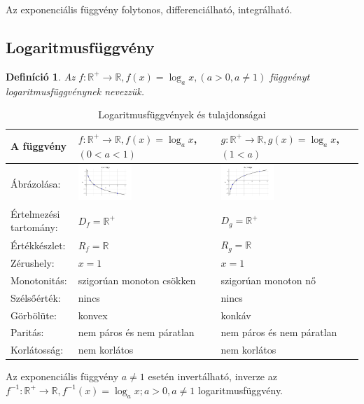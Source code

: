 \documentclass[12pt,a4paper]{article}
\newtheorem{definition}{Definíció} [section]
\begin{document}
Az exponenciális függvény folytonos, differenciálható, integrálható.

\newpage
\subsection{Logaritmusfüggvény}
\begin{definition}
Az $f:\mathbb{R}^+\rightarrow\mathbb{R}, f(x)=\log_ax, (a>0, a\neq 1)$  függvényt logaritmusfüggvénynek nevezzük.
\end{definition}

\begin{table}[h!]
\centering
\begin{tabular}{ | m{3cm} || m{6cm} | m{6cm} | }
A függvény & $f:\mathbb{R}^+\rightarrow\mathbb{R}, f(x)=\log_ax$,\newline $(0<a<1)$ & $g:\mathbb{R}^+\rightarrow\mathbb{R}, g(x)=\log_ax$,\newline $(1<a)$ \\
\hline
Ábrázolása: &\centering \includegraphics[width=0.4\textwidth]{chart/2021-10-31--12:59:11} & \includegraphics[width=0.4\textwidth]{chart/2021-10-31--13:00:36}\\
\hline
Értelmezési tartomány: & $D_f=\mathbb{R}^+$ & $D_g=\mathbb{R}^+$ \\
\hline
Értékkészlet: & $R_f=\mathbb{R}$ & $R_g=\mathbb{R}$\\
\hline
Zérushely: & $x = 1$& $x = 1$\\
\hline
Monotonitás: &szigorúan monoton csökken&szigorúan monoton nő \\
\hline
Szélsőérték: & nincs & nincs\\
\hline
Görbölüte: & konvex & konkáv\\
\hline
Paritás: & nem páros és nem páratlan & nem páros és nem páratlan \\
\hline
Korlátosság: & nem korlátos & nem korlátos \\
\end{tabular}
\caption{Logaritmusfüggvények és tulajdonságai}
\label{table:log_fugg}
\end{table}
Az exponenciális függvény $a\neq 1$ esetén invertálható, inverze az $f^{-1}:\mathbb{R}^+\rightarrow \mathbb{R}, f^{-1}(x)=\log_ax; a>0, a\neq 1$ logaritmusfüggvény.
\end{document}
